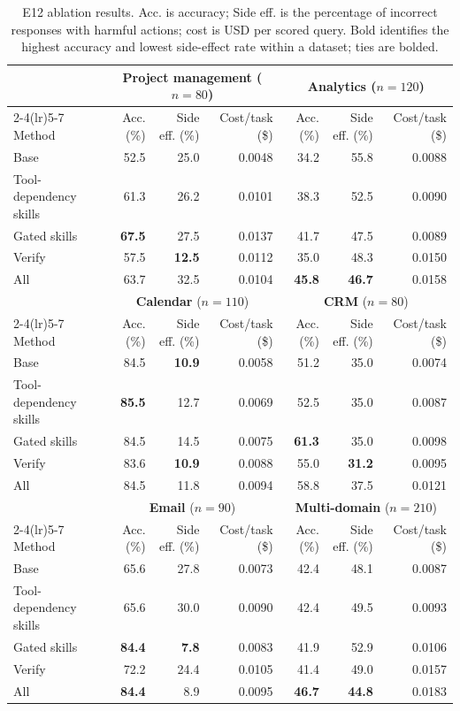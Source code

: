 \documentclass[acmsmall]{acmart}
\begin{document}
\begin{table}[H]
\centering
\scriptsize
\setlength{\tabcolsep}{2pt}
\caption{E12 ablation results. Acc. is accuracy; Side eff. is the percentage of incorrect
responses with harmful actions; cost is USD per scored query. Bold identifies the highest
accuracy and lowest side-effect rate within a dataset; ties are bolded.}
\label{tab:e12-all-results}
\begin{tabular}{@{}lrrrrrr@{}}
\toprule
& \multicolumn{3}{c}{\textbf{Project management} ($n=80$)}
& \multicolumn{3}{c}{\textbf{Analytics} ($n=120$)} \\
\cmidrule(lr){2-4}\cmidrule(lr){5-7}
Method & Acc. (\%) & Side eff. (\%) & Cost/task (\$) & Acc. (\%) & Side eff. (\%) & Cost/task (\$) \\
\midrule
Base & 52.5 & 25.0 & 0.0048 & 34.2 & 55.8 & 0.0088 \\
Tool-dependency skills & 61.3 & 26.2 & 0.0101 & 38.3 & 52.5 & 0.0090 \\
Gated skills & \textbf{67.5} & 27.5 & 0.0137 & 41.7 & 47.5 & 0.0089 \\
Verify & 57.5 & \textbf{12.5} & 0.0112 & 35.0 & 48.3 & 0.0150 \\
All & 63.7 & 32.5 & 0.0104 & \textbf{45.8} & \textbf{46.7} & 0.0158 \\
\midrule
& \multicolumn{3}{c}{\textbf{Calendar} ($n=110$)}
& \multicolumn{3}{c}{\textbf{CRM} ($n=80$)} \\
\cmidrule(lr){2-4}\cmidrule(lr){5-7}
Method & Acc. (\%) & Side eff. (\%) & Cost/task (\$) & Acc. (\%) & Side eff. (\%) & Cost/task (\$) \\
\midrule
Base & 84.5 & \textbf{10.9} & 0.0058 & 51.2 & 35.0 & 0.0074 \\
Tool-dependency skills & \textbf{85.5} & 12.7 & 0.0069 & 52.5 & 35.0 & 0.0087 \\
Gated skills & 84.5 & 14.5 & 0.0075 & \textbf{61.3} & 35.0 & 0.0098 \\
Verify & 83.6 & \textbf{10.9} & 0.0088 & 55.0 & \textbf{31.2} & 0.0095 \\
All & 84.5 & 11.8 & 0.0094 & 58.8 & 37.5 & 0.0121 \\
\midrule
& \multicolumn{3}{c}{\textbf{Email} ($n=90$)}
& \multicolumn{3}{c}{\textbf{Multi-domain} ($n=210$)} \\
\cmidrule(lr){2-4}\cmidrule(lr){5-7}
Method & Acc. (\%) & Side eff. (\%) & Cost/task (\$) & Acc. (\%) & Side eff. (\%) & Cost/task (\$) \\
\midrule
Base & 65.6 & 27.8 & 0.0073 & 42.4 & 48.1 & 0.0087 \\
Tool-dependency skills & 65.6 & 30.0 & 0.0090 & 42.4 & 49.5 & 0.0093 \\
Gated skills & \textbf{84.4} & \textbf{7.8} & 0.0083 & 41.9 & 52.9 & 0.0106 \\
Verify & 72.2 & 24.4 & 0.0105 & 41.4 & 49.0 & 0.0157 \\
All & \textbf{84.4} & 8.9 & 0.0095 & \textbf{46.7} & \textbf{44.8} & 0.0183 \\
\bottomrule
\end{tabular}
\end{table}

\end{document}
